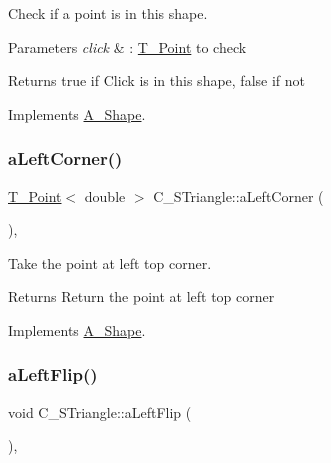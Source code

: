 Check if a point is in this shape. 


\begin{DoxyParams}{Parameters}
{\em click} & \+: \hyperlink{classT__Point}{T\+\_\+\+Point} to check \\
\hline
\end{DoxyParams}
\begin{DoxyReturn}{Returns}
true if Click is in this shape, false if not 
\end{DoxyReturn}


Implements \hyperlink{classA__Shape_a63f825cbc9780208d9a137f5c14917d0}{A\+\_\+\+Shape}.

\mbox{\label{classC__STriangle_a8e580f80693ea6f66cca3782ced8e301}} 
\subsubsection{\texorpdfstring{a\+Left\+Corner()}{aLeftCorner()}}
{\footnotesize\ttfamily \hyperlink{classT__Point}{T\+\_\+\+Point}$<$ double $>$ C\+\_\+\+S\+Triangle\+::a\+Left\+Corner (\begin{DoxyParamCaption}{ }\end{DoxyParamCaption})\hspace{0.3cm}{\ttfamily [override]}, {\ttfamily [virtual]}}



Take the point at left top corner. 

\begin{DoxyReturn}{Returns}
Return the point at left top corner 
\end{DoxyReturn}


Implements \hyperlink{classA__Shape_abe6781b13037bf7ecea8ff9456b31533}{A\+\_\+\+Shape}.

\mbox{\label{classC__STriangle_aff480b9ec706ee5ae58f6f78318e2728}} 
\subsubsection{\texorpdfstring{a\+Left\+Flip()}{aLeftFlip()}}
{\footnotesize\ttfamily void C\+\_\+\+S\+Triangle\+::a\+Left\+Flip (\begin{DoxyParamCaption}{ }\end{DoxyParamCaption})\hspace{0.3cm}{\ttfamily [override]}, {\ttfamily [virtual]}}



